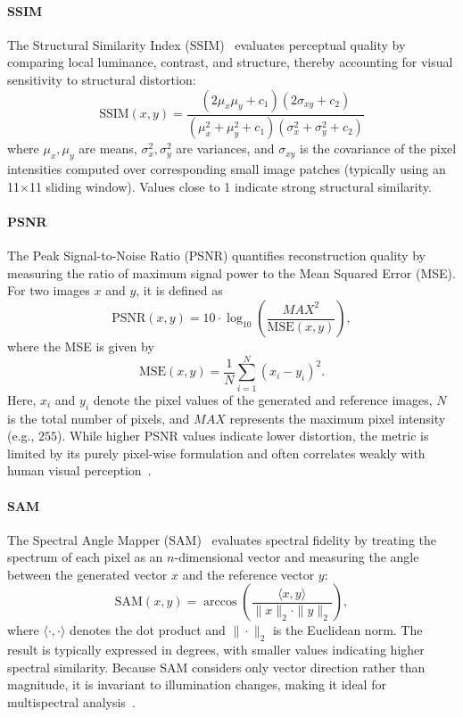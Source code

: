 \paragraph{\textbf{SSIM}} The Structural Similarity Index (SSIM)~\cite{iqa_ssim} evaluates perceptual quality by comparing local luminance, contrast, and structure, thereby accounting for visual sensitivity to structural distortion:
\begin{equation}
\text{SSIM}(x,y) = \frac{(2\mu_x \mu_y + c_1)(2\sigma_{xy} + c_2)}{(\mu_x^2 + \mu_y^2 + c_1)(\sigma_x^2 + \sigma_y^2 + c_2)}
\end{equation}
where $\mu_x, \mu_y$ are means, $\sigma_x^2, \sigma_y^2$ are variances, and $\sigma_{xy}$ is the covariance of the pixel intensities computed over corresponding small image patches (typically using an 11$\times$11 sliding window). Values close to 1 indicate strong structural similarity.


\paragraph{\textbf{PSNR}} 
The Peak Signal-to-Noise Ratio (PSNR) quantifies reconstruction quality by measuring the ratio of maximum signal power to the Mean Squared Error (MSE). For two images $x$ and $y$, it is defined as
\begin{equation}
\text{PSNR}(x,y) = 10 \cdot \log_{10} \left( \frac{MAX^2}{\text{MSE}(x,y)} \right),
\end{equation}
where the MSE is given by
\begin{equation}
\text{MSE}(x,y) = \frac{1}{N} \sum_{i=1}^{N} (x_i - y_i)^2.
\end{equation}
Here, $x_i$ and $y_i$ denote the pixel values of the generated and reference images, $N$ is the total number of pixels, and $MAX$ represents the maximum pixel intensity (e.g., $255$). While higher PSNR values indicate lower distortion, the metric is limited by its purely pixel-wise formulation and often correlates weakly with human visual perception~\cite{DiffCR}.


\paragraph{\textbf{SAM}} 
The Spectral Angle Mapper (SAM)~\cite{iqa_sam} evaluates spectral fidelity by treating the spectrum of each pixel as an \(n\)-dimensional vector and measuring the angle between the generated vector $x$ and the reference vector $y$:
\begin{equation}
\text{SAM}(x,y) = \arccos \left( \frac{\langle x, y \rangle}{\|x\|_2 \cdot \|y\|_2} \right),
\end{equation}
where $\langle \cdot, \cdot \rangle$ denotes the dot product and $\|\cdot\|_2$ is the Euclidean norm. The result is typically expressed in degrees, with smaller values indicating higher spectral similarity. Because SAM considers only vector direction rather than magnitude, it is invariant to illumination changes, making it ideal for multispectral analysis~\cite{S2MS_GAN}.


